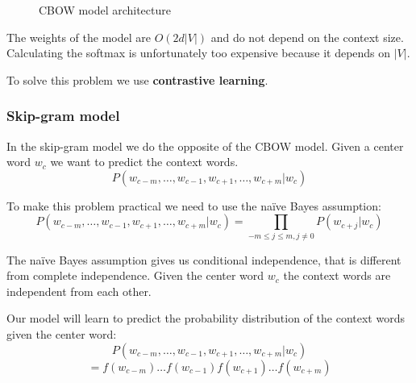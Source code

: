 \begin{figure}[H]
    \centering
    \caption{CBOW model architecture}
    \label{fig:cbow_model}
\end{figure}

The weights of the model are $O(2d|V|)$ and do not depend on the context size.
Calculating the softmax is unfortunately too expensive because it depends on $|V|$.

To solve this problem we use \textbf{contrastive learning}.

\subsubsection{Skip-gram model}

In the skip-gram model we do the opposite of the CBOW model.
Given a center word $w_c$ we want to predict the context words.
\[
    P(w_{c-m},\dots,w_{c-1},w_{c+1},\dots,w_{c+m}|w_c)
\]

To make this problem practical we need to use the na\"ive Bayes assumption:
\[
    P(w_{c-m},\dots,w_{c-1},w_{c+1},\dots,w_{c+m}|w_c)=\prod_{-m\leq j\leq m,j\neq 0}P(w_{c+j}|w_c)
\]

The na\"ive Bayes assumption gives us conditional independence, that is
different from complete independence.
Given the center word $w_c$ the context words are independent from each other.

Our model will learn to predict the probability distribution of the context words given the center word:
\[
    P(w_{c-m},\dots,w_{c-1},w_{c+1},\dots,w_{c+m}|w_c)
\]
\[
    =f(w_{c-m})\dots f(w_{c-1})f(w_{c+1})\dots f(w_{c+m})
\]

